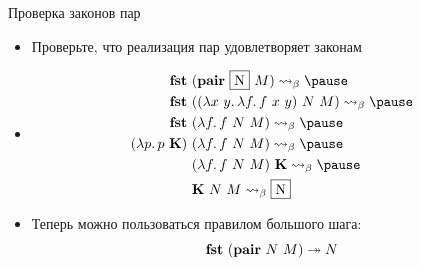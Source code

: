     \begin{frame}[fragile]{Проверка законов пар}
        \begin{itemize}
            \item[\todo] Проверьте, что реализация пар удовлетворяет законам
            \item[\answer] \pause
            \begin{align*}
                \term{fst} \ap &(\term{pair} \ap \framebox{N} \ap M)
                \step_\beta \pause \\
                \term{fst} \ap &((\lambda x~y\ldotp \lambda f \ldotp f \ap x \ap y) \ap N \ap M)
                \step_\beta \pause \\
                \term{fst} \ap &(\lambda f \ldotp f \ap N \ap M)
                \step_\beta \pause \\
                (\lambda p \ldotp p \ap \term{K}) \ap &(\lambda f \ldotp f \ap N \ap M)
                \step_\beta \pause \\
                &(\lambda f \ldotp f \ap N \ap M) \ap \term{K}
                \step_\beta \pause \\
                &\term{K} \ap N \ap M \step_{\beta} \framebox{N}
            \end{align*}
            \item Теперь можно пользоваться правилом большого шага:
            \begin{equation*}
                \mathbf{fst} ~ (\mathbf{pair} ~ N ~ M) \twoheadrightarrow N
            \end{equation*}
        \end{itemize}
    \end{frame}

